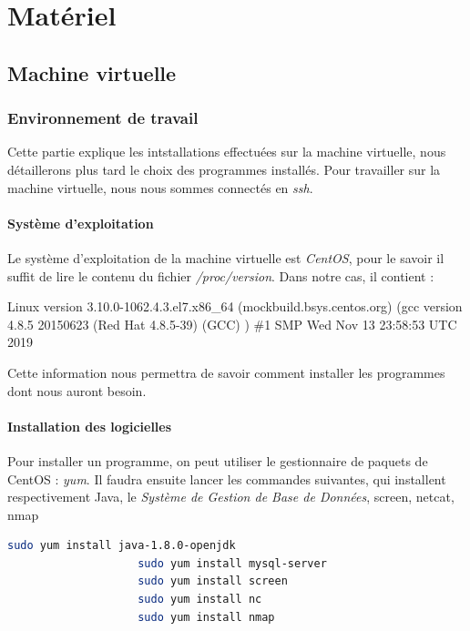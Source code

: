 \documentclass[a4paper, 11pt]{report}
\begin{document}
\chapter{Matériel}
\section{Machine virtuelle}
	\subsection{Environnement de travail}
		Cette partie explique les intstallations effectuées sur la machine virtuelle, nous détaillerons plus tard le choix des programmes installés.
		Pour travailler sur la machine virtuelle, nous nous sommes connectés en \emph{ssh}.
		\subsubsection{Système d'exploitation}
			Le système d'exploitation de la machine virtuelle est \emph{CentOS}, pour le savoir il suffit de lire le contenu du fichier \emph{/proc/version}.
			Dans notre cas, il contient : 
			\begin{mdframed}[backgroundcolor=light-gray, roundcorner=20pt,
				leftmargin=0, rightmargin=0, 
				innerleftmargin=20, linecolor=darkgray]
				Linux version 3.10.0-1062.4.3.el7.x86\_64 (mockbuild\@kbuilder.bsys.centos.org) (gcc version 4.8.5 20150623 (Red Hat 4.8.5-39) (GCC) ) \#1 SMP Wed Nov 13 23:58:53 UTC 2019
			\end{mdframed}
			Cette information nous permettra de savoir comment installer les programmes dont nous auront besoin.
		\subsubsection{Installation des logicielles}
			Pour installer un programme, on peut utiliser le gestionnaire de paquets de CentOS : \emph{yum}.
			Il faudra ensuite lancer les commandes suivantes, qui installent respectivement Java, le \emph{Système de Gestion de Base de Données}, screen, netcat, nmap
			\begin{mdframed}[backgroundcolor=light-gray, roundcorner=20pt,
				leftmargin=0, rightmargin=0, 
				innerleftmargin=20, linecolor=darkgray]
				\begin{lstlisting}[language=bash]
					sudo yum install java-1.8.0-openjdk
					sudo yum install mysql-server
					sudo yum install screen
					sudo yum install nc
					sudo yum install nmap
				\end{lstlisting}
			\end{mdframed}
\end{document}
